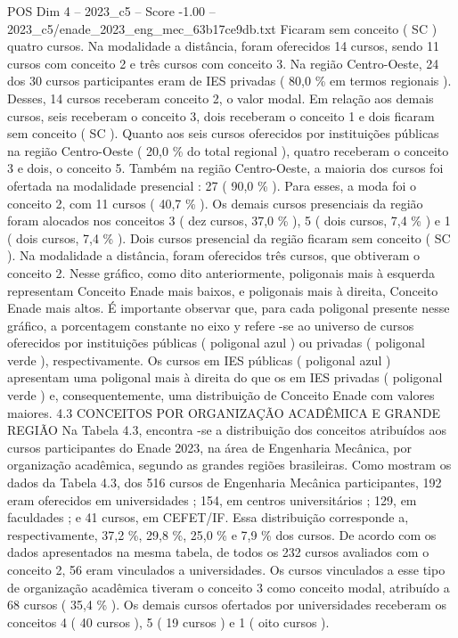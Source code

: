 \begin{textsample}{POS Dim 4 – 2023\_c5 – Score -1.00 – 2023\_c5/enade\_2023\_eng\_mec\_63b17ce9db.txt}
Ficaram sem conceito ( SC ) quatro cursos.
Na modalidade a distância, foram oferecidos 14 cursos, sendo 11 cursos com conceito 2 e três cursos com conceito 3.
Na região Centro-Oeste, 24 dos 30 cursos participantes eram de IES privadas ( 80,0 \% em termos regionais ).
Desses, 14 cursos receberam conceito 2, o valor modal.
Em relação aos demais cursos, seis receberam o conceito 3, dois receberam o conceito 1 e dois ficaram sem conceito ( SC ).
Quanto aos seis cursos oferecidos por instituições públicas na região Centro-Oeste ( 20,0 \% do total regional ), quatro receberam o conceito 3 e dois, o conceito 5.
Também na região Centro-Oeste, a maioria dos cursos foi ofertada na modalidade presencial : 27 ( 90,0 \% ).
Para esses, a moda foi o conceito 2, com 11 cursos ( 40,7 \% ).
Os demais cursos presenciais da região foram alocados nos conceitos 3 ( dez cursos, 37,0 \% ), 5 ( dois cursos, 7,4 \% ) e 1 ( dois cursos, 7,4 \% ).
Dois cursos presencial da região ficaram sem conceito ( SC ).
Na modalidade a distância, foram oferecidos três cursos, que obtiveram o conceito 2.
Nesse gráfico, como dito anteriormente, poligonais mais à esquerda representam Conceito Enade mais baixos, e poligonais mais à direita, Conceito Enade mais altos.
É importante observar que, para cada poligonal presente nesse gráfico, a porcentagem constante no eixo y refere -se ao universo de cursos oferecidos por instituições públicas ( poligonal azul ) ou privadas ( poligonal verde ), respectivamente.
Os cursos em IES públicas ( poligonal azul ) apresentam uma poligonal mais à direita do que os em IES privadas ( poligonal verde ) e, consequentemente, uma distribuição de Conceito Enade com valores maiores. 4.3 CONCEITOS POR ORGANIZAÇÃO ACADÊMICA E GRANDE REGIÃO Na Tabela 4.3, encontra -se a distribuição dos conceitos atribuídos aos cursos participantes do Enade 2023, na área de Engenharia Mecânica, por organização acadêmica, segundo as grandes regiões brasileiras.
Como mostram os dados da Tabela 4.3, dos 516 cursos de Engenharia Mecânica participantes, 192 eram oferecidos em universidades ; 154, em centros universitários ; 129, em faculdades ; e 41 cursos, em CEFET/IF.
Essa distribuição corresponde a, respectivamente, 37,2 \%, 29,8 \%, 25,0 \% e 7,9 \% dos cursos.
De acordo com os dados apresentados na mesma tabela, de todos os 232 cursos avaliados com o conceito 2, 56 eram vinculados a universidades.
Os cursos vinculados a esse tipo de organização acadêmica tiveram o conceito 3 como conceito modal, atribuído a 68 cursos ( 35,4 \% ).
Os demais cursos ofertados por universidades receberam os conceitos 4 ( 40 cursos ), 5 ( 19 cursos ) e 1 ( oito cursos ).

\end{textsample}
